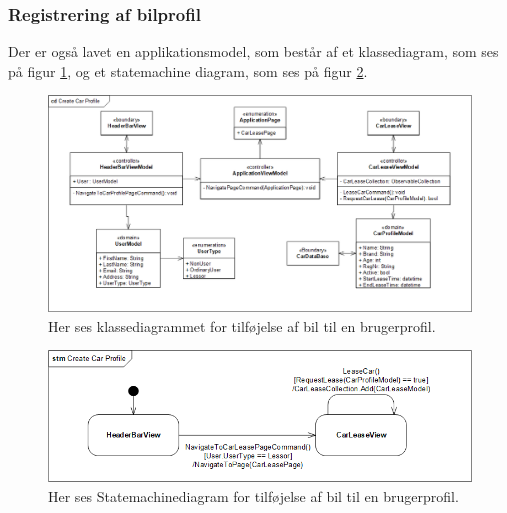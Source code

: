 \documentclass[Arkitektur/System_main.tex]{subfiles}
\begin{document}
\subsubsection{Registrering af bilprofil}
Der er også lavet en applikationsmodel, som består af et klassediagram, som ses på figur \ref{fig:RegisterCarProfileCD}, og et statemachine diagram, som ses på figur \ref{fig:RegisterCarProfileSTM}.
\begin{figure}[H]
    \centering
    \includegraphics[width=1\textwidth]{Arkitektur/Softwarearkitektur/Car_registration/graphics/RegisterCarProfileCD.png}
    \caption{Her ses klassediagrammet for tilføjelse af bil til en brugerprofil. }
    \label{fig:RegisterCarProfileCD}
\end{figure}

\begin{figure}[H]
    \centering
    \includegraphics[width=1\textwidth]{Arkitektur/Softwarearkitektur/Car_registration/graphics/RegisterCarProfileSTM.png}
    \caption{Her ses Statemachinediagram for tilføjelse af bil til en brugerprofil. }
    \label{fig:RegisterCarProfileSTM}
\end{figure}

\end{document}
